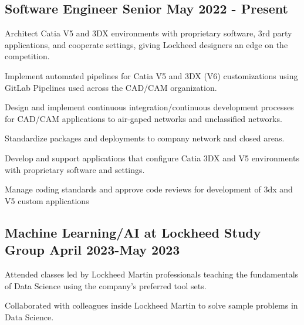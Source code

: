 \subsection{{Software Engineer Senior \hfill May 2022 - Present}}
\begin{zitemize}
	\item Architect Catia V5 and 3DX environments with proprietary software, 3rd party applications, and cooperate settings, giving Lockheed designers an edge on the competition. 
	\item Implement automated pipelines for Catia V5 and 3DX (V6) customizations using GitLab Pipelines used across the CAD/CAM organization.
	\item Design and implement continuous integration/continuous development  processes for CAD/CAM applications to air-gaped networks and unclassified networks.\\
	\item Standardize packages and deployments to company network and closed areas.
	\item Develop and support applications that configure Catia 3DX and V5 environments with proprietary software and settings.
	\item Manage coding standards and approve code reviews for development of 3dx and V5 custom applications\\
\end{zitemize}

\subsection{{Machine Learning/AI at Lockheed Study Group \hfill April 2023-May 2023}}
\begin{zitemize}
\item Attended classes led by Lockheed Martin professionals teaching the fundamentals of Data Science using the company's preferred tool sets.
\item Collaborated with colleagues inside Lockheed Martin to solve sample problems in Data Science.
\end{zitemize}

